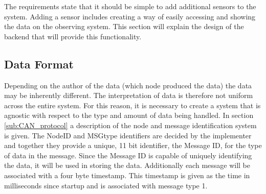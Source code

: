 The requirements state that it should be simple to add additional sensors to the system.
Adding a sensor includes creating a way of easily accessing and showing the data on the observing system.
This section will explain the design of the backend that will provide this functionality.

\subsection{Data Format}
Depending on the author of the data (which node produced the data) the data may be inherently different.
The interpretation of data is therefore not uniform across the entire system.
For this reason, it is necessary to create a system that is agnostic with respect to the type and amount of data being handled.
In section \ref{sub:CAN_protocol} a description of the node and message identification system is given.
The NodeID and MSGtype identifiers are decided by the implementer and together they provide a unique, 11 bit identifier, the Message ID, for the type of data in the message.
Since the Message ID is capable of uniquely identifying the data, it will be used in storing the data.
Additionally each message will be associated with a four byte timestamp.
This timestamp is given as the time in milliseconds since startup and is associated with message type 1.

